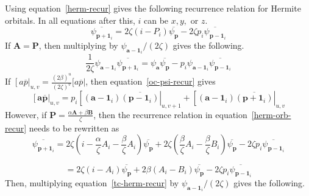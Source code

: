 \documentclass[twoside,10pt,draft]{article}
\begin{document}
Using equation~\ref{herm-recur} gives the following recurrence relation for Hermite orbitals. In all equations after this, $i$ can be $x, y,$ or $z$.
\begin{equation}
  \overline{\psi_{\mathbf{p} + \mathbf{1}_i}} = 2\zeta\left(i - P_i\right)\overline{\psi_{\mathbf{p}}} - 2\zeta p_i\overline{\psi_{\mathbf{p} - \mathbf{1}_i}}
  \label{herm-orb-recur}
\end{equation}
If $\mathbf{A} = \mathbf{P}$, then multiplying by $\psi_{\mathbf{a} - \mathbf{1}_i} / (2\zeta)$ gives the following.
\begin{equation}
  \frac{1}{2\zeta} \psi_{\mathbf{a} - \mathbf{1}_i} \overline{\psi_{\mathbf{p} + \mathbf{1}_i}} = \psi_{\mathbf{a}}\overline{\psi_{\mathbf{p}}} - p_i \psi_{\mathbf{a} - \mathbf{1}_i}\overline{\psi_{\mathbf{p} - \mathbf{1}_i}}
  \label{oc-psi-recur}
\end{equation}
If $\left[a\overline{p}\right|_{u,v} = \frac{(2\beta)^u}{(2\zeta)^v}[a\overline{p}|$, then equation~\ref{oc-psi-recur} gives
\begin{equation}
  \left[\mathbf{a}\overline{\mathbf{p}}\right|_{u,v} = p_i\left[\left(\mathbf{a} - \mathbf{1}_i\right)\overline{\left(\mathbf{p} - \mathbf{1}_i\right)}\right|_{u,v+1} + \left[\left(\mathbf{a} - \mathbf{1}_i\right)\overline{\left(\mathbf{p} + \mathbf{1}_i\right)}\right|_{u,v}
  \label{oc-recur}
\end{equation}
However, if $\mathbf{P} = \frac{\alpha \mathbf{A} + \beta\mathbf{B}}{\zeta}$, then the recurrence relation in equation~\ref{herm-orb-recur} needs to be rewritten as
\begin{equation}
  \overline{\psi_{\mathbf{p} + \mathbf{1}_i}} = 2\zeta\left(i - \frac{\alpha}{\zeta}A_i - \frac{\beta}{\zeta}A_i\right)\overline{\psi_{\mathbf{p}}} + 2\zeta\left(\frac{\beta}{\zeta}A_i - \frac{\beta}{\zeta}B_i\right)\overline{\psi_{\mathbf{p}}} - 2\zeta p_i\overline{\psi_{\mathbf{p} - \mathbf{1}_i}}
\end{equation}

\begin{equation}
  = 2\zeta\left(i - A_i\right)\overline{\psi_{\mathbf{p}}} + 2\beta\left(A_i - B_i\right)\overline{\psi_{\mathbf{p}}} - 2\zeta p_i\overline{\psi_{\mathbf{p} - \mathbf{1}_i}}
  \label{tc-herm-recur}
\end{equation}
Then, multiplying equation~\ref{tc-herm-recur} by $\psi_{\mathbf{a} - \mathbf{1}_i} / (2\zeta)$ gives the following.
\end{document}
